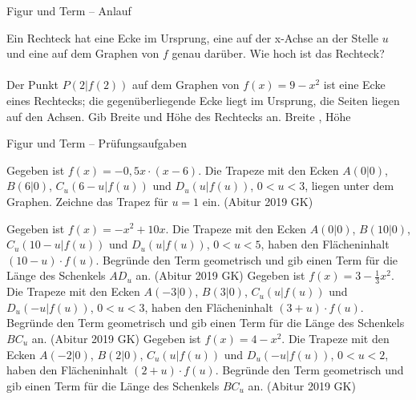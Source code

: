 \setcounter{aufgabe}{59}

\begin{aufgabe}{Figur und Term – Anlauf}
\begin{teile}
\teil Ein Rechteck hat eine Ecke im Ursprung, eine auf der x-Achse an der Stelle $u$ und eine auf dem Graphen von $f$ genau darüber. Wie hoch ist das Rechteck?  \\  \\ 
\teil Der Punkt $P(2 | f(2))$ auf dem Graphen von $f(x) = 9 - x^2$ ist eine Ecke eines Rechtecks; die gegenüberliegende Ecke liegt im Ursprung, die Seiten liegen auf den Achsen. Gib Breite und Höhe des Rechtecks an. Breite \leerfeld , Höhe \leerfeld
\end{teile}
\end{aufgabe}

\begin{aufgabe}{Figur und Term – Prüfungsaufgaben}
\begin{teile}
\teil Gegeben ist $f(x) = -0{,}5x \cdot (x - 6)$. Die Trapeze mit den Ecken $A(0 | 0)$, $B(6 | 0)$, $C_u(6 - u | f(u))$ und $D_u(u | f(u))$, $0 < u < 3$, liegen unter dem Graphen. Zeichne das Trapez für $u = 1$ ein. \hfill (Abitur 2019 GK)

\begin{ksys}[xmin=-1,xmax=7,ymin=-1,ymax=5]  \end{ksys}
\teil Gegeben ist $f(x) = -x^2 + 10x$. Die Trapeze mit den Ecken $A(0 | 0)$, $B(10 | 0)$, $C_u(10 - u | f(u))$ und $D_u(u | f(u))$, $0 < u < 5$, haben den Flächeninhalt $(10 - u) \cdot f(u)$. Begründe den Term geometrisch und gib einen Term für die Länge des Schenkels $AD_u$ an. \hfill (Abitur 2019 GK)
\teil Gegeben ist $f(x) = 3 - \tfrac{1}{3}x^2$. Die Trapeze mit den Ecken $A(-3 | 0)$, $B(3 | 0)$, $C_u(u | f(u))$ und $D_u(-u | f(u))$, $0 < u < 3$, haben den Flächeninhalt $(3 + u) \cdot f(u)$. Begründe den Term geometrisch und gib einen Term für die Länge des Schenkels $BC_u$ an. \hfill (Abitur 2019 GK)
\teil Gegeben ist $f(x) = 4 - x^2$. Die Trapeze mit den Ecken $A(-2 | 0)$, $B(2 | 0)$, $C_u(u | f(u))$ und $D_u(-u | f(u))$, $0 < u < 2$, haben den Flächeninhalt $(2 + u) \cdot f(u)$. Begründe den Term geometrisch und gib einen Term für die Länge des Schenkels $BC_u$ an. \hfill (Abitur 2019 GK)
\end{teile}
\end{aufgabe}

